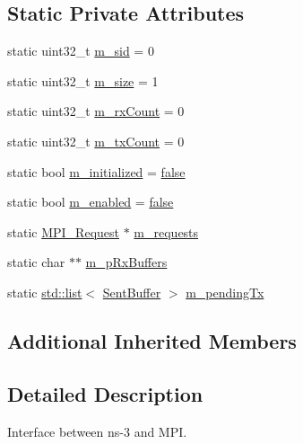 \subsection*{Static Private Attributes}
\begin{DoxyCompactItemize}
\item 
static uint32\+\_\+t \hyperlink{classns3_1_1GrantedTimeWindowMpiInterface_a44f846e917be914a4cdb2f6163ff974c}{m\+\_\+sid} = 0
\item 
static uint32\+\_\+t \hyperlink{classns3_1_1GrantedTimeWindowMpiInterface_a22f9b74660dac51a833c12e2a7ba8d88}{m\+\_\+size} = 1
\item 
static uint32\+\_\+t \hyperlink{classns3_1_1GrantedTimeWindowMpiInterface_ad7cdeaaf3923270223e0f735d4c95ad4}{m\+\_\+rx\+Count} = 0
\item 
static uint32\+\_\+t \hyperlink{classns3_1_1GrantedTimeWindowMpiInterface_a9a5af8c59f7ef88b328df8ea986124d8}{m\+\_\+tx\+Count} = 0
\item 
static bool \hyperlink{classns3_1_1GrantedTimeWindowMpiInterface_a9f207d79b96b45a7194d6e2cb23f69ec}{m\+\_\+initialized} = \hyperlink{lte__cqi__generation_8m_ab1bef239d413c4da139c4bac92cd657a}{false}
\item 
static bool \hyperlink{classns3_1_1GrantedTimeWindowMpiInterface_a87d21c7f96d00b2169577b752f7393e9}{m\+\_\+enabled} = \hyperlink{lte__cqi__generation_8m_ab1bef239d413c4da139c4bac92cd657a}{false}
\item 
static \hyperlink{granted-time-window-mpi-interface_8h_a31b372fd1cca939295900acb2a4961dd}{M\+P\+I\+\_\+\+Request} $\ast$ \hyperlink{classns3_1_1GrantedTimeWindowMpiInterface_a6d0d65442212c4017dca88cb86a06069}{m\+\_\+requests}
\item 
static char $\ast$$\ast$ \hyperlink{classns3_1_1GrantedTimeWindowMpiInterface_a93d55e9d2243e6839d0944c6b5587f03}{m\+\_\+p\+Rx\+Buffers}
\item 
static \hyperlink{openflow-interface_8h_afd9bcfa176617760671b67580f536fa7}{std\+::list}$<$ \hyperlink{classns3_1_1SentBuffer}{Sent\+Buffer} $>$ \hyperlink{classns3_1_1GrantedTimeWindowMpiInterface_aa693374d000a2eb89e4cef36dbea17a0}{m\+\_\+pending\+Tx}
\end{DoxyCompactItemize}
\subsection*{Additional Inherited Members}


\subsection{Detailed Description}
Interface between ns-\/3 and M\+PI. 

